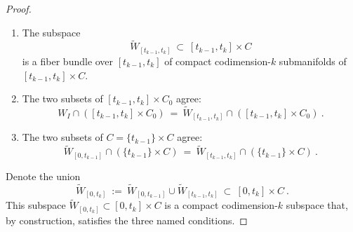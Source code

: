 \documentclass[10pt,a4paper]{amsart}
\newcommand{\w}{\widetilde}
\begin{document}
\begin{proof}
\begin{enumerate}
    \item The subspace
    \[
    \w{W}_{[t_{k-1},t_k]}
    ~\subset~
    [t_{k-1},t_k] \times C
    \]
    is a fiber bundle over $[t_{k-1},t_k]$ of compact codimension-$k$ submanifolds of $[t_{k-1},t_k] \times C$.

    
    \item The two subsets of $[t_{k-1},t_k] \times C_0$ agree:
    \[
    W_I \cap ([t_{k-1},t_k] \times C_0)
    ~=~
    \w{W}_{[t_{k-1},t_k]} \cap ([t_{k-1},t_k] \times C_0) 
    ~.
    \]

    \item The two subsets of $C = \{t_{k-1}\} \times C$ agree:
    \[
    \w{W}_{[0,t_{k-1}]} \cap ( \{t_{k-1}\} \times C)
    ~=~
    \w{W}_{[t_{k-1},t_k]} \cap (\{t_{k-1}\} \times C) 
    ~.
    \]
    
\end{enumerate}
Denote the union
\[
\w{W}_{[0,t_k]}
~:=~
\w{W}_{[0,t_{k-1}]} \cup \w{W}_{[t_{k-1},t_k]}
~\subset~
[0,t_k] \times C
~.
\]
This subspace $\w{W}_{[0,t_k]} \subset [0,t_k] \times C$ is a compact codimension-$k$ subspace that, by construction, satisfies the three named conditions.


\end{proof}
\end{document}
